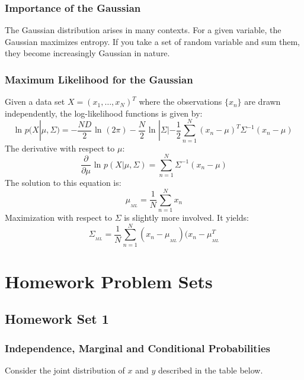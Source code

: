 \documentclass[11pt]{article} %
\begin{document}
\subsubsection{Importance of the Gaussian}

The Gaussian distribution arises in many contexts. For a given variable, the Gaussian maximizes entropy. If you take a set of random variable and sum them, they become increasingly Gaussian in nature. 

\subsubsection{Maximum Likelihood for the Gaussian}

Given a data set $X=(x_1,\ldots,x_N)^T$ where the observations $\{x_n\}$ are drawn independently, the log-likelihood functions is given by:
\begin{equation}
\text{ln }p(X|\mu,\Sigma) = - \frac{ND}{2} \text{ ln }(2\pi)-\frac{N}{2}\text{ ln }|\Sigma| - \frac{1}{2}\sum_{n=1}^{N} (x_n-\mu)^T\Sigma^{-1}(x_n-\mu)
\end{equation}
The derivative with respect to $\mu$:
\begin{equation}
\frac{\partial}{\partial \mu} \text{ ln } p(X|\mu,\Sigma) = \sum_{n=1}^{N} \Sigma^{-1}(x_n - \mu)
\end{equation}
The solution to this equation is:
\begin{equation}
\mu_{_{ML}} = \frac{1}{N} \sum_{n=1}^{N} x_n
\end{equation}
Maximization with respect to $\Sigma$ is slightly more involved. It yields:
\begin{equation}
\Sigma_{_{ML}} = \frac{1}{N}\sum_{n=1}^{N} (x_n - \mu_{_{ML}})(x_n - \mu_{_{ML}}^T
\end{equation}




\newpage


\section{Homework Problem Sets}

\subsection{Homework Set 1}

\subsubsection{Independence, Marginal and Conditional Probabilities}
Consider the joint distribution of $x$ and $y$ described in the table below.\\
\end{document}

